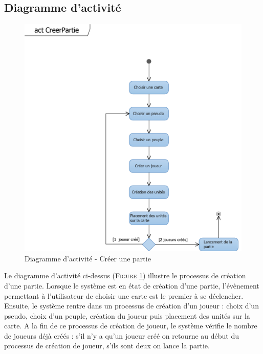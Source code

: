 \documentclass[a4paper,11pt]{article}
\begin{document}
\subsection{Diagramme d'activité}
\vspace*{0.5cm}
\begin{figure}[ht!]
\includegraphics{actCreerPartie.png}
\caption{Diagramme d'activité - Créer une partie}
\label{fig:actcreer}
\end{figure}
\vspace*{1cm}
Le diagramme d'activité ci-dessus (\textsc{Figure \ref{fig:actcreer}}) illustre le processus de création d'une partie. Lorsque le système est en état de création d'une partie, l'évènement permettant à l'utilisateur de choisir une carte est le premier à se déclencher. Ensuite, le système rentre dans un processus de création d'un joueur : choix d'un pseudo, choix d'un peuple, création du joueur puis placement des unités sur la carte. A la fin de ce processus de création de joueur, le système vérifie le nombre de joueurs déjà créés : s'il n'y a qu'un joueur créé on retourne au début du processus de création de joueur, s'ils sont deux on lance la partie.
\newpage
\end{document}
